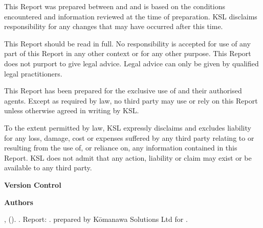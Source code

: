 This Report was prepared between \reportstartdate{} and \reportenddate{} and is based on the conditions encountered and information reviewed at the time of preparation. KSL disclaims responsibility for any changes that may have occurred after this time.

This Report should be read in full. No responsibility is accepted for use of any part of this Report in any other context or for any other purpose. This Report does not purport to give legal advice. Legal advice can only be given by qualified legal practitioners.

This Report has been prepared for the exclusive use of \client{} and their authorised agents. Except as required by law, no third party may use or rely on this Report unless otherwise agreed in writing by KSL.

To the extent permitted by law, KSL expressly disclaims and excludes liability for any loss, damage, cost or expenses suffered by any third party relating to or resulting from the use of, or reliance on, any information contained in this Report. KSL does not admit that any action, liability or claim may exist or be available to any third party.

\newpage

\color{ksldarkblue} \LARGE \textbf{Version Control}
\color{black} \normalsize



\color{ksldarkblue} \LARGE \textbf{Authors}
\color{black} \normalsize

\authors




\begin{breakawaybox}[label={box:sugcite}, title=Suggested Citation, flushleft title]{}
    \textbf{\authorcite{}},
    (\getYear{\reportenddate}). \textit{\reporttitle{}}.
    Report: \projcode{}.\nthreport{} prepared by Kōmanawa Solutions Ltd for \client.
\end{breakawaybox}

\newpage